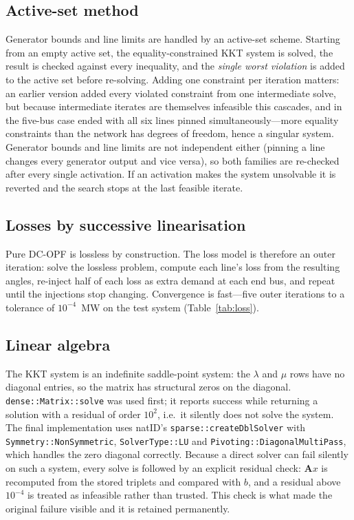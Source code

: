 \documentclass[conference]{IEEEtran}
\begin{document}
\subsection{Active-set method}
Generator bounds and line limits are handled by an active-set scheme. Starting from an empty active set, the equality-constrained KKT system is solved, the result is checked against every inequality, and the \emph{single worst violation} is added to the active set before re-solving. Adding one constraint per iteration matters: an earlier version added every violated constraint from one intermediate solve, but because intermediate iterates are themselves infeasible this cascades, and in the five-bus case ended with all six lines pinned simultaneously---more equality constraints than the network has degrees of freedom, hence a singular system. Generator bounds and line limits are not independent either (pinning a line changes every generator output and vice versa), so both families are re-checked after every single activation. If an activation makes the system unsolvable it is reverted and the search stops at the last feasible iterate.

\subsection{Losses by successive linearisation}
Pure DC-OPF is lossless by construction. The loss model is therefore an outer iteration: solve the lossless problem, compute each line's loss from the resulting angles, re-inject half of each loss as extra demand at each end bus, and repeat until the injections stop changing. Convergence is fast---five outer iterations to a tolerance of $10^{-4}$~MW on the test system (Table~\ref{tab:loss}).

\subsection{Linear algebra}
The KKT system is an indefinite saddle-point system: the $\lambda$ and $\mu$ rows have no diagonal entries, so the matrix has structural zeros on the diagonal. \texttt{dense::Matrix::solve} was used first; it reports success while returning a solution with a residual of order $10^2$, i.e.\ it silently does not solve the system. The final implementation uses natID's \texttt{sparse::createDblSolver} with \texttt{Symmetry::NonSymmetric}, \texttt{SolverType::LU} and \texttt{Pivoting::DiagonalMultiPass}, which handles the zero diagonal correctly. Because a direct solver can fail silently on such a system, every solve is followed by an explicit residual check: $\mathbf{A}x$ is recomputed from the stored triplets and compared with $b$, and a residual above $10^{-4}$ is treated as infeasible rather than trusted. This check is what made the original failure visible and it is retained permanently.
\end{document}

